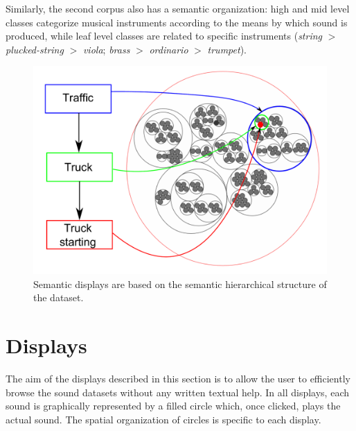 \documentclass{aes2e}
\begin{document}
Similarly, the second corpus also has a semantic organization: high and mid level classes categorize musical instruments according to the means by which sound is produced, while leaf level classes are related to specific instruments (\textit{string} $>$ \textit{plucked-string} $>$ \textit{viola}; \textit{brass} $>$ \textit{ordinario} $>$ \textit{trumpet}).


\begin{figure}[t]
\begin{center}
\includegraphics[scale=0.24]{gfx/SSF.pdf} 
\end{center}
\caption{\label{figSSF} Semantic displays are  based on the semantic hierarchical structure of the dataset.}
\end{figure}


\section{Displays} \label{display}

The aim of the displays described in this section is to allow the user to efficiently browse the sound datasets without any written textual help. In all displays, each sound is graphically represented by a filled circle which, once clicked, plays the actual sound. The spatial organization of circles is specific to each display.
\end{document}
